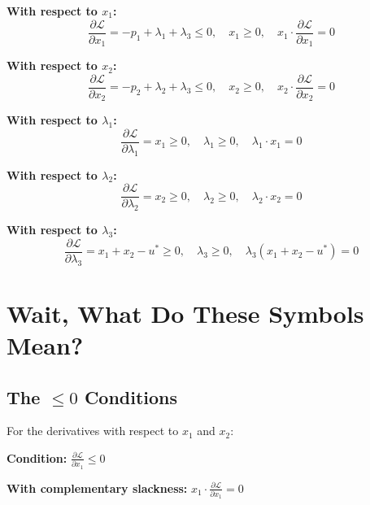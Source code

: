 \documentclass[11pt]{article}
\begin{document}
\begin{tcolorbox}[colback=yellow!10!white,colframe=orange!75!black,title=Optimality Conditions for Problem 2]

\textbf{With respect to $x_1$:}
\begin{equation}
\frac{\partial \mathcal{L}}{\partial x_1} = -p_1 + \lambda_1 + \lambda_3 \leq 0, \quad x_1 \geq 0, \quad x_1 \cdot \frac{\partial \mathcal{L}}{\partial x_1} = 0
\end{equation}

\textbf{With respect to $x_2$:}
\begin{equation}
\frac{\partial \mathcal{L}}{\partial x_2} = -p_2 + \lambda_2 + \lambda_3 \leq 0, \quad x_2 \geq 0, \quad x_2 \cdot \frac{\partial \mathcal{L}}{\partial x_2} = 0
\end{equation}

\textbf{With respect to $\lambda_1$:}
\begin{equation}
\frac{\partial \mathcal{L}}{\partial \lambda_1} = x_1 \geq 0, \quad \lambda_1 \geq 0, \quad \lambda_1 \cdot x_1 = 0
\end{equation}

\textbf{With respect to $\lambda_2$:}
\begin{equation}
\frac{\partial \mathcal{L}}{\partial \lambda_2} = x_2 \geq 0, \quad \lambda_2 \geq 0, \quad \lambda_2 \cdot x_2 = 0
\end{equation}

\textbf{With respect to $\lambda_3$:}
\begin{equation}
\frac{\partial \mathcal{L}}{\partial \lambda_3} = x_1 + x_2 - u^* \geq 0, \quad \lambda_3 \geq 0, \quad \lambda_3(x_1 + x_2 - u^*) = 0
\end{equation}
\end{tcolorbox}

\section{Wait, What Do These Symbols Mean?}

\subsection{The $\leq 0$ Conditions}

For the derivatives with respect to $x_1$ and $x_2$:

\textbf{Condition:} $\frac{\partial \mathcal{L}}{\partial x_1} \leq 0$

\textbf{With complementary slackness:} $x_1 \cdot \frac{\partial \mathcal{L}}{\partial x_1} = 0$
\end{document}
